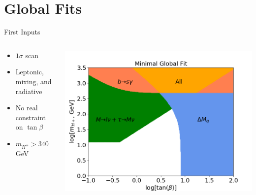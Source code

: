\documentclass[10pt,xcolor={table,dvipsnames},t]{beamer}
\begin{document}
\section{Global Fits}
\begin{frame}{First Inputs}
    \begin{columns}[c]
        \begin{column}{0.33\textwidth}
            \begin{itemize}
                \item $1\sigma$ scan
                \item Leptonic, mixing, and radiative
                \item No real constraint on $\tan\beta$
                \item $m_{H^+} > 340\,$GeV
            \end{itemize}
        \end{column}
        \begin{column}{0.60\textwidth}
            \includegraphics[scale=0.35]{global}
        \end{column}
    \end{columns}
\end{frame}
\end{document}
